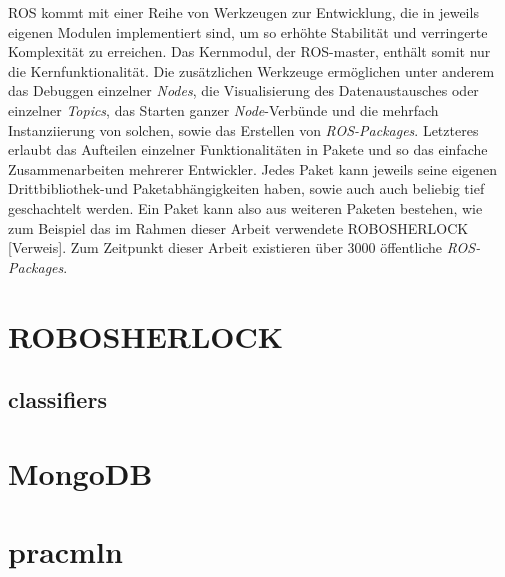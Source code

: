 ROS kommt mit einer Reihe von Werkzeugen zur Entwicklung, die in jeweils eigenen Modulen implementiert sind, um so erhöhte Stabilität und verringerte Komplexität zu erreichen. Das Kernmodul, der ROS-master, enthält somit nur die Kernfunktionalität. Die zusätzlichen Werkzeuge ermöglichen unter anderem das Debuggen einzelner \textit{Nodes}, die Visualisierung des Datenaustausches oder einzelner \textit{Topics}, das Starten ganzer \textit{Node}-Verbünde und die mehrfach Instanziierung von solchen, sowie das Erstellen von \textit{ROS-Packages}. Letzteres erlaubt das Aufteilen einzelner Funktionalitäten in Pakete und so das einfache Zusammenarbeiten mehrerer Entwickler. Jedes Paket kann jeweils seine eigenen Drittbibliothek-und Paketabhängigkeiten haben, sowie auch auch beliebig tief geschachtelt werden. Ein Paket kann also aus weiteren Paketen bestehen, wie zum Beispiel das im Rahmen dieser Arbeit verwendete ROBOSHERLOCK [Verweis]. Zum Zeitpunkt dieser Arbeit existieren über 3000 öffentliche \textit{ROS-Packages}.   

\section{ROBOSHERLOCK}
\label{chap:robosherlock}

\subsection{classifiers}
\label{chap:classifiers}


\section{MongoDB}
\label{chap:mongodb}


\section{pracmln}
\label{chap:pracmln}
